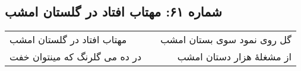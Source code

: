 \begin{center}
\section*{شماره ۶۱: مهتاب افتاد در گلستان امشب}
\label{sec:061}
\begin{longtable}{l p{0.5cm} r}
مهتاب افتاد در گلستان امشب
&&
گل روی نمود سوی بستان امشب
\\
در ده می گلرنگ که مینتوان خفت
&&
از مشغلهٔ هزار دستان امشب
\\
\end{longtable}
\end{center}
